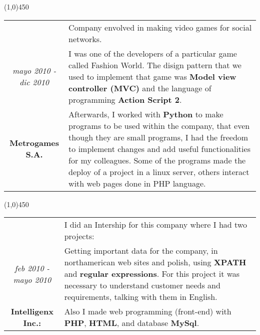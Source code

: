 \begin{center}
\line(1,0){450}
\end{center}
\noindent
\begin{tabular}{c|p{12.5cm}}
& \large Company envolved in making video games for social networks. \\
\large\textit{mayo 2010 - dic 2010} &  \large I was one of the developers of a particular game called Fashion World. The disign pattern that we used to implement that game was \textbf{Model view controller (MVC)} and the language of programming \textbf{Action Script 2}.\\
\large\textbf{Metrogames S.A.} & \large Afterwards, I worked with \textbf{Python} to make programs to be used within the company, that even though they are small programs, I had the freedom to implement changes and add useful functionalities for my colleagues. Some of the programs made the deploy of a project in a linux server, others interact with web pages done in PHP language.
\end{tabular}

\begin{center}
\line(1,0){450}
\end{center}
\noindent
\begin{tabular}{c|p{12.5cm}}
& \large I did an Intership for this company where I had two projects:\\
\large\textit{feb 2010 - mayo 2010} & \large Getting important data for the company, in northamerican web sites and polish, using \textbf{XPATH} and \textbf{regular expressions}.  For this project it was necessary to understand customer needs and requirements, talking with them in English.\\
\large\textbf{Intelligenx Inc.:} & \large Also I made web programming (front-end) with \textbf{PHP}, \textbf{HTML}, and database \textbf{MySql}.
\end{tabular}

